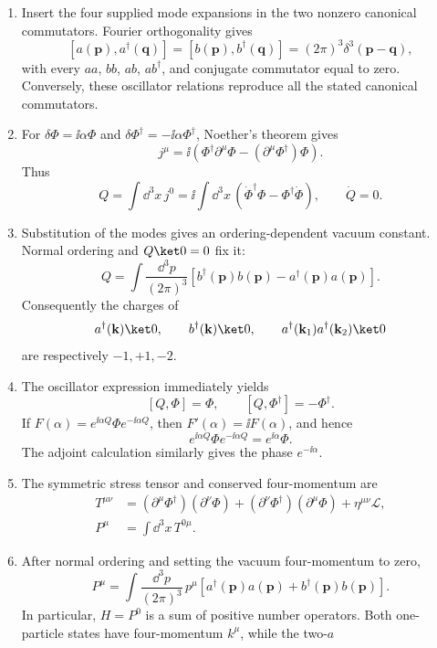 \begin{enumerate}
\begin{enumerate}
\item
Insert the four supplied mode expansions in the two nonzero canonical
commutators.  Fourier orthogonality gives
\[
 [a(\mathbf p),a^\dagger(\mathbf q)]
 =[b(\mathbf p),b^\dagger(\mathbf q)]
 =(2\pi)^3\delta^3(\mathbf p-\mathbf q),
\]
with every \(aa\), \(bb\), \(ab\), \(ab^\dagger\), and conjugate
commutator equal to zero.  Conversely, these oscillator relations
reproduce all the stated canonical commutators.
\item
For
\(\delta\Phi=\ii\alpha\Phi\) and
\(\delta\Phi^\dagger=-\ii\alpha\Phi^\dagger\), Noether's theorem gives
\[
 j^\mu=\ii\left(\Phi^\dagger\partial^\mu\Phi
 -(\partial^\mu\Phi^\dagger)\Phi\right).
\]
Thus
\[
 Q=\int \dd^3x\,j^0
 =\ii\int \dd^3x\,
 \left(\dot\Phi^\dagger\Phi-\Phi^\dagger\dot\Phi\right),
\qquad \dot Q=0.
\]
\item
Substitution of the modes gives an ordering-dependent vacuum constant.
Normal ordering and \(Q\ket0=0\) fix it:
\[
 Q=\int\frac{\dd^3p}{(2\pi)^3}
 \left[b^\dagger(\mathbf p)b(\mathbf p)
 -a^\dagger(\mathbf p)a(\mathbf p)\right].
\]
Consequently the charges of
\[
 a^\dagger(\mathbf k)\ket0,\qquad
 b^\dagger(\mathbf k)\ket0,\qquad
 a^\dagger(\mathbf k_1)a^\dagger(\mathbf k_2)\ket0
\]
are respectively \(-1,+1,-2\).
\item
The oscillator expression immediately yields
\[
 [Q,\Phi]=\Phi,\qquad [Q,\Phi^\dagger]=-\Phi^\dagger.
\]
If \(F(\alpha)=e^{\ii\alpha Q}\Phi e^{-\ii\alpha Q}\), then
\(F'(\alpha)=\ii F(\alpha)\), and hence
\[
 e^{\ii\alpha Q}\Phi e^{-\ii\alpha Q}=e^{\ii\alpha}\Phi.
\]
The adjoint calculation similarly gives the phase \(e^{-\ii\alpha}\).
\item
The symmetric stress tensor and conserved four-momentum are
\[
\begin{split}
 T^{\mu\nu}
 &=(\partial^\mu\Phi^\dagger)(\partial^\nu\Phi)
  +(\partial^\nu\Phi^\dagger)(\partial^\mu\Phi)
  +\eta^{\mu\nu}\mathcal L,\\
 P^\mu&=\int \dd^3x\,T^{0\mu}.
\end{split}
\]
\item
After normal ordering and setting the vacuum four-momentum to zero,
\[
 P^\mu=\int\frac{\dd^3p}{(2\pi)^3}\,p^\mu
 \left[a^\dagger(\mathbf p)a(\mathbf p)
 +b^\dagger(\mathbf p)b(\mathbf p)\right].
\]
In particular, \(H=P^0\) is a sum of positive number operators.  Both
one-particle states have four-momentum \(k^\mu\), while the two-\(a\)

\end{enumerate}
\end{enumerate}
